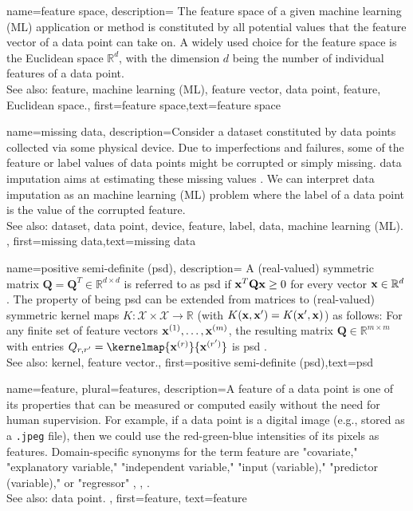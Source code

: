 {name={feature space},
	description={
		The feature space of a given machine learning (ML) application or method is 
		constituted by all potential values that the feature vector of a data point can 
		take on. A widely used choice for the feature space is the Euclidean space $\mathbb{R}^{d}$, 
		with the dimension $d$ being the number of individual features of a data point.
				\\
		See also: feature, machine learning (ML), feature vector, data point, feature, Euclidean space.},
	first={feature space},text={feature space}  
}


{name={missing data},
	description={Consider a dataset constituted by data points collected via 
		some physical device. Due to imperfections and failures, some of the feature 
		or label values of data points might be corrupted or simply missing. 
		\Gls{data} imputation aims at estimating these missing values \cite{Abayomi2008DiagnosticsFM}. 
		We can interpret data imputation as an machine learning (ML) problem where the label of a data point is 
		the value of the corrupted feature.
				\\
		See also: dataset, data point, device, feature, label, data, machine learning (ML). },
	first={missing data},text={missing data}  
}


{name={positive semi-definite (psd)},
	description=
	{A (real-valued) symmetric matrix $\mathbf{Q} = \mathbf{Q}^{T} \in \mathbb{R}^{d \times d}$ 
	 is referred to as psd if ${\bf x}^{T} \mathbf{Q} {\bf x} \geq 0$ for every vector ${\bf x} \in \mathbb{R}^{d}$. 
	 The property of being psd can be extended from matrices to (real-valued) 
	 symmetric kernel maps $K: \mathcal{X} \times \mathcal{X} \rightarrow \mathbb{R}$ 
	 (with $K({\bf x},{\bf x}') = K({\bf x}',{\bf x})$)
	 as follows: For any finite set of feature vectors ${\bf x}^{(1)},\dots,{\bf x}^{(m)}$, 
	 the resulting matrix $\mathbf{Q} \in \mathbb{R}^{m \times m}$ with 
	entries $Q_{r,r'} = \kernelmap{{\bf x}^{(r)}}{{\bf x}^{(r')}}$ 
	is psd \cite{LearningKernelsBook}.
			\\
		See also: kernel, feature vector.},
	first={positive semi-definite (psd)},text={psd}  
}

{name={feature}, plural={features},
	description={A feature of a data point is one of its properties that can be 
		measured or computed easily without the need for human supervision. For example, if a data point 
		is a digital image (e.g., stored as a \texttt{.jpeg} file), then we could use the red-green-blue intensities 
		of its pixels as features. Domain-specific synonyms for the term feature are "covariate," "explanatory variable," 
		"independent variable," "input (variable)," "predictor (variable)," or "regressor" \cite{Gujarati2021}, \cite{Dodge2003}, \cite{Everitt2022}. 
				\\
		See also: data point.
		}, first={feature},
		text={feature}  
}

